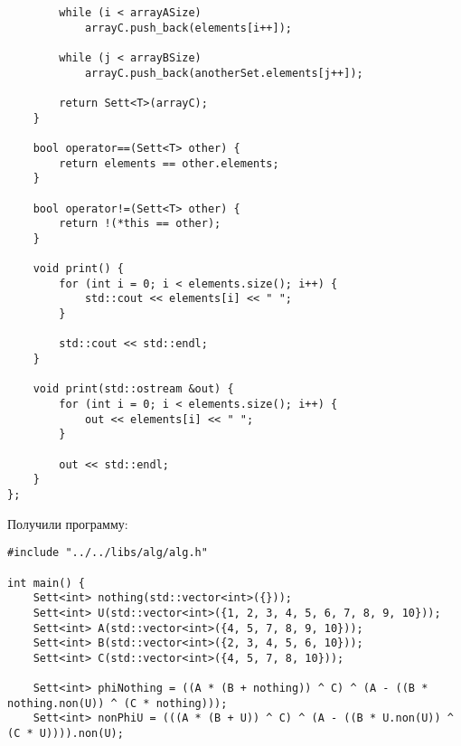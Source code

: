 \documentclass[a4paper,14pt]{extarticle}
\begin{document}
\begin{enumerate}[№1. ]
\begin{verbatim}
		while (i < arrayASize)
			arrayC.push_back(elements[i++]);
		
		while (j < arrayBSize)
			arrayC.push_back(anotherSet.elements[j++]);
		
		return Sett<T>(arrayC);
	}
	
	bool operator==(Sett<T> other) {
		return elements == other.elements;
	}
	
	bool operator!=(Sett<T> other) {
		return !(*this == other);
	}
	
	void print() {
		for (int i = 0; i < elements.size(); i++) {
			std::cout << elements[i] << " ";
		}
		
		std::cout << std::endl;
	}
	
	void print(std::ostream &out) {
		for (int i = 0; i < elements.size(); i++) {
			out << elements[i] << " ";
		}
		
		out << std::endl;
	}
};
\end{verbatim}
Получили программу:\\
\begin{verbatim}
#include "../../libs/alg/alg.h"
	
int main() {
	Sett<int> nothing(std::vector<int>({}));
	Sett<int> U(std::vector<int>({1, 2, 3, 4, 5, 6, 7, 8, 9, 10}));
	Sett<int> A(std::vector<int>({4, 5, 7, 8, 9, 10}));
	Sett<int> B(std::vector<int>({2, 3, 4, 5, 6, 10}));
	Sett<int> C(std::vector<int>({4, 5, 7, 8, 10}));
		
	Sett<int> phiNothing = ((A * (B + nothing)) ^ C) ^ (A - ((B * nothing.non(U)) ^ (C * nothing)));
	Sett<int> nonPhiU = (((A * (B + U)) ^ C) ^ (A - ((B * U.non(U)) ^ (C * U)))).non(U);
	

\end{verbatim}
\end{enumerate}
\end{document}
